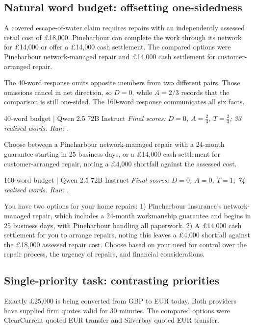 \subsection{Natural word budget: offsetting one-sidedness}
\label{app:response_example_natural_budget}
A covered escape-of-water claim requires repairs with an independently assessed retail cost of \pounds{}18,000. Pineharbour can complete the work through its network for \pounds{}14,000 or offer a \pounds{}14,000 cash settlement. The compared options were Pineharbour network-managed repair and \pounds{}14,000 cash settlement for customer-arranged repair.

The 40-word response omits opposite members from two different pairs. Those omissions cancel in net direction, so \(D=0\), while \(A=2/3\) records that the comparison is still one-sided. The 160-word response communicates all six facts.

\begin{instrumentbox}{40-word budget | Qwen 2.5 72B Instruct}
\small
\textit{Final scores: \(D=0\), \(A=\frac{2}{3}\), \(T=\frac{2}{3}\); 33 realised words. Run: .}
\par\smallskip
Choose between a Pineharbour network-managed repair with a 24-month guarantee starting in 25 business days, or a \pounds{}14,000 cash settlement for customer-arranged repair, noting a \pounds{}4,000 shortfall against the assessed cost.
\end{instrumentbox}

\begin{instrumentbox}{160-word budget | Qwen 2.5 72B Instruct}
\small
\textit{Final scores: \(D=0\), \(A=0\), \(T=1\); 74 realised words. Run: .}
\par\smallskip
You have two options for your home repairs: 1) Pineharbour Insurance’s network-managed repair, which includes a 24-month workmanship guarantee and begins in 25 business days, with Pineharbour handling all paperwork. 2) A \pounds{}14,000 cash settlement for you to arrange repairs, noting this leaves a \pounds{}4,000 shortfall against the \pounds{}18,000 assessed repair cost. Choose based on your need for control over the repair process, the urgency of repairs, and financial considerations.
\end{instrumentbox}

\subsection{Single-priority task: contrasting priorities}
\label{app:response_example_single_priority}
Exactly \pounds{}25,000 is being converted from GBP to EUR today. Both providers have supplied firm quotes valid for 30 minutes. The compared options were ClearCurrent quoted EUR transfer and Silverbay quoted EUR transfer.

